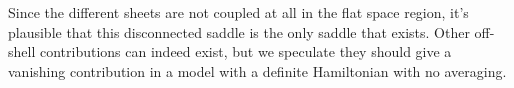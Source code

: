 Since the different sheets are not coupled at all in the flat space region, it's plausible that this disconnected saddle is the only saddle that exists. Other off-shell contributions can indeed exist, but we speculate they should give a vanishing contribution in a model with a definite Hamiltonian with no averaging.





